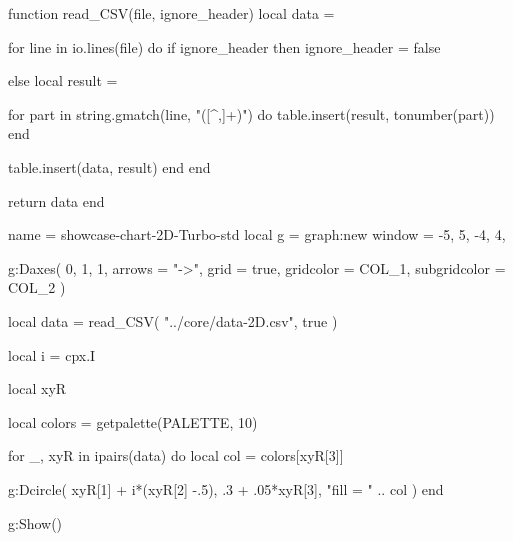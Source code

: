 \documentclass{tutodoc}
\newcommand{\PALETTE}{Turbo}
\begin{document}

\vfill

\begin{luacode*}
function read_CSV(file, ignore_header)
  local data = {}

  for line in io.lines(file) do
    if ignore_header then
      ignore_header = false

    else
      local result = {}

      for part in string.gmatch(line, "([^,]+)") do
        table.insert(result, tonumber(part))
      end

      table.insert(data, result)
    end
  end

  return data
end
\end{luacode*}


\begin{luadraw}{name = showcase-chart-2D-\PALETTE-std}
local g = graph:new{
  window = {-5, 5, -4, 4},
}

g:Daxes(
  {0, 1, 1},
  {
    arrows       = "->", 
    grid         = true,
    gridcolor    = COL_1,
    subgridcolor = COL_2
  }
)

local data = read_CSV(
  "../core/data-2D.csv",
  true
)

local i = cpx.I

local xyR

local colors = getpalette(PALETTE, 10)

for _, xyR in ipairs(data) do
  local col = colors[xyR[3]]

  g:Dcircle(
    xyR[1] + i*(xyR[2] -.5), .3 + .05*xyR[3],
    "fill = " .. col
  )
end

g:Show()
\end{luadraw}
\end{document}
